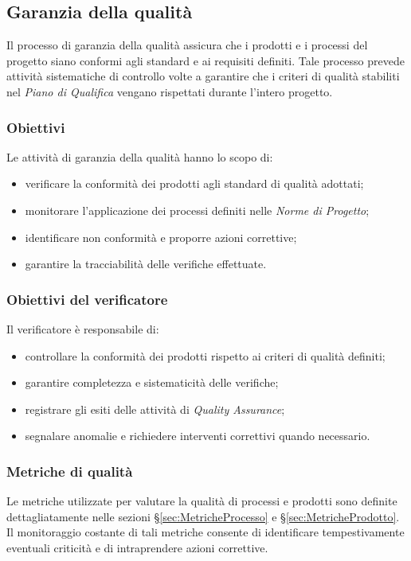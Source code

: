 \documentclass[10pt, letterpaper]{article}
\begin{document}
\subsection{Garanzia della qualità}
Il processo di garanzia della qualità assicura che i prodotti e i processi del progetto
siano conformi agli standard e ai requisiti definiti. Tale processo prevede attività
sistematiche di controllo volte a garantire che i criteri di qualità stabiliti nel
\textit{Piano di Qualifica} vengano rispettati durante l'intero progetto.

\subsubsection{Obiettivi}
Le attività di garanzia della qualità hanno lo scopo di:
\begin{itemize}
    \item verificare la conformità dei prodotti agli standard di qualità adottati;
    \item monitorare l'applicazione dei processi definiti nelle \textit{Norme di Progetto};
    \item identificare non conformità e proporre azioni correttive;
    \item garantire la tracciabilità delle verifiche effettuate.
\end{itemize}

\subsubsection{Obiettivi del verificatore}
Il verificatore è responsabile di:
\begin{itemize}
    \item controllare la conformità dei prodotti rispetto ai criteri di qualità definiti;
    \item garantire completezza e sistematicità delle verifiche;
    \item registrare gli esiti delle attività di \textit{Quality Assurance};
    \item segnalare anomalie e richiedere interventi correttivi quando necessario.
\end{itemize}

\subsubsection{Metriche di qualità}
\label{sec:MetricheQualita}
Le metriche utilizzate per valutare la qualità di processi e prodotti sono definite
dettagliatamente nelle sezioni §\ref{sec:MetricheProcesso} e §\ref{sec:MetricheProdotto}.
Il monitoraggio costante di tali metriche consente di identificare tempestivamente
eventuali criticità e di intraprendere azioni correttive.
\end{document}
